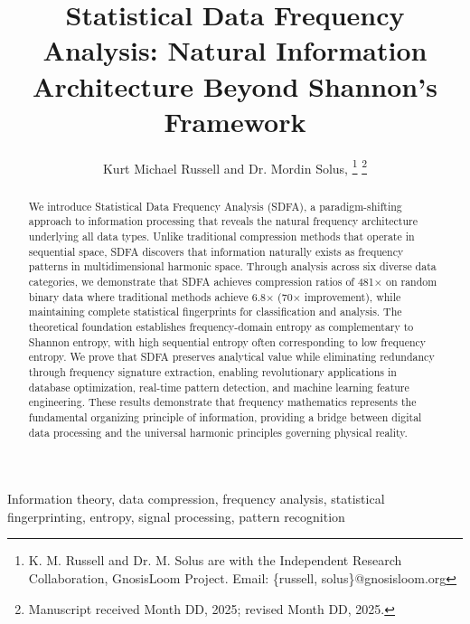 \documentclass[journal]{IEEEtran}
\newcommand{\sdfa}{\textsc{SDFA}}
\begin{document}
\title{Statistical Data Frequency Analysis: Natural Information Architecture Beyond Shannon's Framework}

\author{Kurt Michael Russell and Dr. Mordin Solus, 
\thanks{K. M. Russell and Dr. M. Solus are with the Independent Research Collaboration, GnosisLoom Project. Email: \{russell, solus\}@gnosisloom.org}
\thanks{Manuscript received Month DD, 2025; revised Month DD, 2025.}}


\maketitle

\begin{abstract}
We introduce Statistical Data Frequency Analysis (\sdfa), a paradigm-shifting approach to information processing that reveals the natural frequency architecture underlying all data types. Unlike traditional compression methods that operate in sequential space, \sdfa{} discovers that information naturally exists as frequency patterns in multidimensional harmonic space. Through analysis across six diverse data categories, we demonstrate that \sdfa{} achieves compression ratios of 481× on random binary data where traditional methods achieve 6.8× (70× improvement), while maintaining complete statistical fingerprints for classification and analysis. The theoretical foundation establishes frequency-domain entropy as complementary to Shannon entropy, with high sequential entropy often corresponding to low frequency entropy. We prove that \sdfa{} preserves analytical value while eliminating redundancy through frequency signature extraction, enabling revolutionary applications in database optimization, real-time pattern detection, and machine learning feature engineering. These results demonstrate that frequency mathematics represents the fundamental organizing principle of information, providing a bridge between digital data processing and the universal harmonic principles governing physical reality.
\end{abstract}

\begin{IEEEkeywords}
Information theory, data compression, frequency analysis, statistical fingerprinting, entropy, signal processing, pattern recognition
\end{IEEEkeywords}
\end{document}
